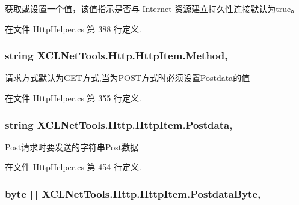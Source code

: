 获取或设置一个值，该值指示是否与 Internet 资源建立持久性连接默认为true。 



在文件 Http\-Helper.\-cs 第 388 行定义.

\hypertarget{class_x_c_l_net_tools_1_1_http_1_1_http_item_ac5086662fb0248c50436d33a38e9552d}{
\subsubsection[{Method}]{\setlength{\rightskip}{0pt plus 5cm}string X\-C\-L\-Net\-Tools.\-Http.\-Http\-Item.\-Method\hspace{0.3cm}{\ttfamily [get]}, {\ttfamily [set]}}}\label{class_x_c_l_net_tools_1_1_http_1_1_http_item_ac5086662fb0248c50436d33a38e9552d}


请求方式默认为\-G\-E\-T方式,当为\-P\-O\-S\-T方式时必须设置\-Postdata的值 



在文件 Http\-Helper.\-cs 第 355 行定义.

\hypertarget{class_x_c_l_net_tools_1_1_http_1_1_http_item_ace6cbdf79c4aab756c172d58380c03c2}{
\subsubsection[{Postdata}]{\setlength{\rightskip}{0pt plus 5cm}string X\-C\-L\-Net\-Tools.\-Http.\-Http\-Item.\-Postdata\hspace{0.3cm}{\ttfamily [get]}, {\ttfamily [set]}}}\label{class_x_c_l_net_tools_1_1_http_1_1_http_item_ace6cbdf79c4aab756c172d58380c03c2}


Post请求时要发送的字符串\-Post数据 



在文件 Http\-Helper.\-cs 第 454 行定义.

\hypertarget{class_x_c_l_net_tools_1_1_http_1_1_http_item_a7bf9bbbd8d1b1d30ef7e9708f5109914}{
\subsubsection[{Postdata\-Byte}]{\setlength{\rightskip}{0pt plus 5cm}byte \mbox{[}$\,$\mbox{]} X\-C\-L\-Net\-Tools.\-Http.\-Http\-Item.\-Postdata\-Byte\hspace{0.3cm}{\ttfamily [get]}, {\ttfamily [set]}}}\label{class_x_c_l_net_tools_1_1_http_1_1_http_item_a7bf9bbbd8d1b1d30ef7e9708f5109914}


